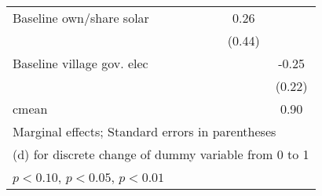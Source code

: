 \begin{table}[htbp]
\begin{tabular*}{1\hsize}{@{\hskip\tabcolsep\extracolsep\fill}l*{6}{c}}
Baseline own/share solar&                  &                  &                  &                  &     0.26         &                  \\
                &                  &                  &                  &                  &   (0.44)         &                  \\
Baseline village gov. elec&                  &                  &                  &                  &                  &    -0.25         \\
                &                  &                  &                  &                  &                  &   (0.22)         \\
\midrule
cmean           &                  &                  &                  &                  &                  &     0.90         \\
\bottomrule
\multicolumn{7}{l}{\footnotesize Marginal effects; Standard errors in parentheses}\\
\multicolumn{7}{l}{\footnotesize  (d) for discrete change of dummy variable from 0 to 1}\\
\multicolumn{7}{l}{\footnotesize \sym{*} \(p<0.10\), \sym{**} \(p<0.05\), \sym{***} \(p<0.01\)}\\
\end{tabular*}
\end{table}
